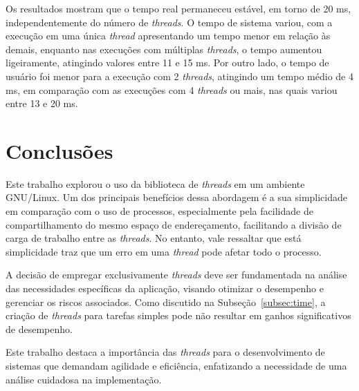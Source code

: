 \documentclass[
	12pt,				%
	oneside,   	        %
	a4paper,			%
	english,			%
	french,				%
	spanish,			%
	brazil,				%
	]{pacotes/abntex2}
\begin{document}
Os resultados mostram que o tempo real permaneceu estável, em torno de 20 ms, independentemente do número de \textit{threads}. O tempo de sistema variou, com a execução em uma única \textit{thread} apresentando um tempo menor em relação às demais, enquanto nas execuções com múltiplas \textit{threads}, o tempo aumentou ligeiramente, atingindo valores entre 11 e 15 ms. Por outro lado, o tempo de usuário foi menor para a execução com 2 \textit{threads}, atingindo um tempo médio de 4 ms, em comparação com as execuções com 4 \textit{threads} ou mais, nas quais variou entre 13 e 20 ms.

\section{Conclusões}
\label{sec:conclusoes}
Este trabalho explorou o uso da biblioteca de \textit{threads} em um ambiente GNU/Linux. Um dos principais benefícios dessa abordagem é a sua simplicidade em comparação com o uso de processos, especialmente pela facilidade de compartilhamento do mesmo espaço de endereçamento, facilitando a divisão de carga de trabalho entre as \textit{threads}. No entanto, vale ressaltar que está simplicidade traz que um erro em uma \textit{thread} pode afetar todo o processo.

A decisão de empregar exclusivamente \textit{threads} deve ser fundamentada na análise das necessidades específicas da aplicação, visando otimizar o desempenho e gerenciar os riscos associados. Como discutido na Subseção~\ref{subsec:time}, a criação de \textit{threads} para tarefas simples pode não resultar em ganhos significativos de desempenho.

Este trabalho destaca a importância das \textit{threads} para o desenvolvimento de sistemas que demandam agilidade e eficiência, enfatizando a necessidade de uma análise cuidadosa na implementação.

\postextual
\renewcommand{\bibsection}{%
\section{\bibname}
\bibmark
\prebibhook}


\end{document}
